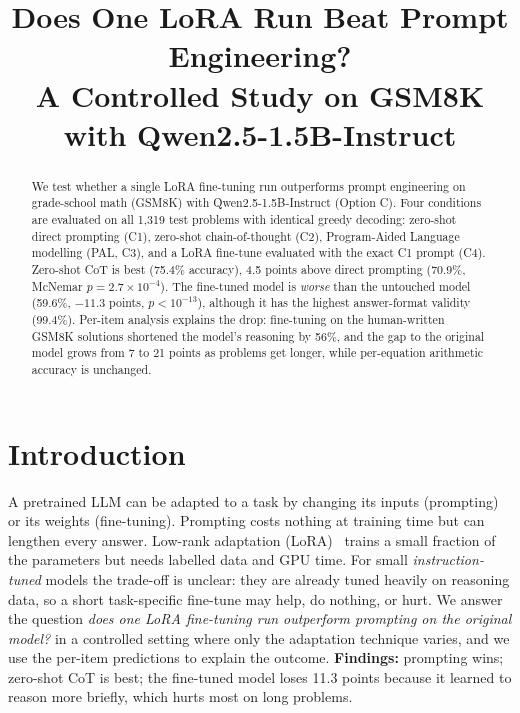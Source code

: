 \documentclass[conference]{IEEEtran}
\begin{document}
\title{Does One LoRA Run Beat Prompt Engineering?\\A Controlled Study on GSM8K with Qwen2.5-1.5B-Instruct}
\author{
}
\maketitle

\begin{abstract}
We test whether a single LoRA fine-tuning run outperforms prompt engineering on grade-school math
(GSM8K) with Qwen2.5-1.5B-Instruct (Option C). Four conditions are evaluated on all 1{,}319 test problems
with identical greedy decoding: zero-shot direct prompting (C1), zero-shot chain-of-thought (C2),
Program-Aided Language modelling (PAL, C3), and a LoRA fine-tune evaluated with the exact C1 prompt (C4).
Zero-shot CoT is best (75.4\% accuracy), 4.5 points above direct prompting (70.9\%, McNemar
$p{=}2.7{\times}10^{-4}$). The fine-tuned model is \emph{worse} than the untouched model (59.6\%, $-11.3$
points, $p{<}10^{-13}$), although it has the highest answer-format validity (99.4\%). Per-item analysis
explains the drop: fine-tuning on the human-written GSM8K solutions shortened the model's reasoning by 56\%,
and the gap to the original model grows from 7 to 21 points as problems get longer, while per-equation
arithmetic accuracy is unchanged.
\end{abstract}

\section{Introduction}
A pretrained LLM can be adapted to a task by changing its inputs (prompting) or its weights (fine-tuning).
Prompting costs nothing at training time but can lengthen every answer. Low-rank adaptation
(LoRA)~\cite{hu2022lora} trains a small fraction of the parameters but needs labelled data and GPU time.
For small \emph{instruction-tuned} models the trade-off is unclear: they are already tuned heavily on
reasoning data, so a short task-specific fine-tune may help, do nothing, or hurt. We answer the question
\emph{does one LoRA fine-tuning run outperform prompting on the original model?} in a controlled setting
where only the adaptation technique varies, and we use the per-item predictions to explain the outcome.
\textbf{Findings:} prompting wins; zero-shot CoT is best; the fine-tuned model loses 11.3 points because it
learned to reason more briefly, which hurts most on long problems.
\end{document}
